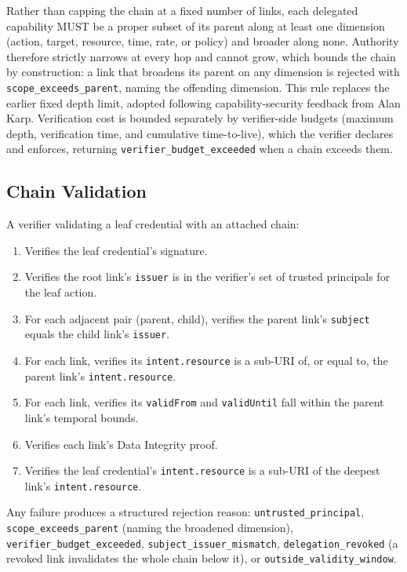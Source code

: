 \documentclass[11pt,a4paper]{article}
\begin{document}
Rather than capping the chain at a fixed number of links, each delegated capability MUST be a proper subset of its parent along at least one dimension (action, target, resource, time, rate, or policy) and broader along none. Authority therefore strictly narrows at every hop and cannot grow, which bounds the chain by construction: a link that broadens its parent on any dimension is rejected with \verb|scope_exceeds_parent|, naming the offending dimension. This rule replaces the earlier fixed depth limit, adopted following capability-security feedback from Alan Karp. Verification cost is bounded separately by verifier-side budgets (maximum depth, verification time, and cumulative time-to-live), which the verifier declares and enforces, returning \verb|verifier_budget_exceeded| when a chain exceeds them.

\subsection{Chain Validation}

A verifier validating a leaf credential with an attached chain:

\begin{enumerate}[label=\arabic*.,leftmargin=*]
\item Verifies the leaf credential's signature.
\item Verifies the root link's \verb|issuer| is in the verifier's set of trusted principals for the leaf action.
\item For each adjacent pair (parent, child), verifies the parent link's \verb|subject| equals the child link's \verb|issuer|.
\item For each link, verifies its \verb|intent.resource| is a sub-URI of, or equal to, the parent link's \verb|intent.resource|.
\item For each link, verifies its \verb|validFrom| and \verb|validUntil| fall within the parent link's temporal bounds.
\item Verifies each link's Data Integrity proof.
\item Verifies the leaf credential's \verb|intent.resource| is a sub-URI of the deepest link's \verb|intent.resource|.
\end{enumerate}

Any failure produces a structured rejection reason: \verb|untrusted_principal|, \verb|scope_exceeds_parent| (naming the broadened dimension), \verb|verifier_budget_exceeded|, \verb|subject_issuer_mismatch|, \verb|delegation_revoked| (a revoked link invalidates the whole chain below it), or \verb|outside_validity_window|.
\end{document}
